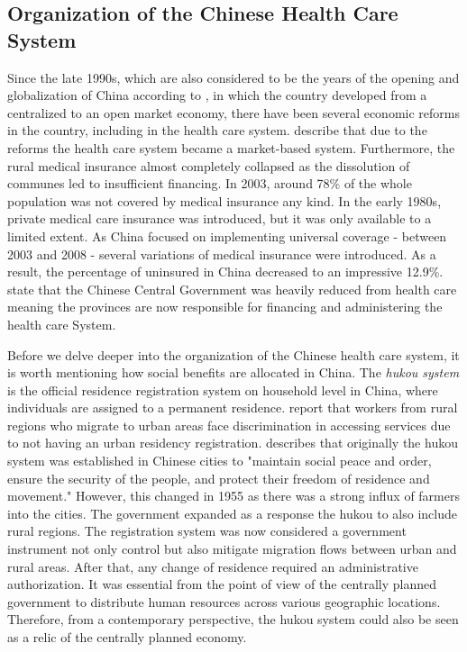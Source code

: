 \documentclass[
]{article}
\begin{document}
	\subsection{Organization of the Chinese Health Care System} \label{orga} 
	Since the late 1990s, which are also considered to be the years of the opening and globalization of China according to \cite{kanbur_fifty_2005} , in which the country developed from a centralized to an open market economy, there have been several economic reforms in the country, including in the health care system.
    \cite{shi_health_2018} describe that due to the reforms the health care system became a market-based system. Furthermore, the rural medical insurance almost completely collapsed as the dissolution of communes led to insufficient financing. In 2003, around 78\% of the whole population was not covered by medical insurance any kind. In the early 1980s, private medical care insurance was introduced, but it was only available to a limited extent. 
	As China focused on implementing universal coverage - between 2003 and 2008 - several variations of medical insurance were introduced. As a result, the percentage of uninsured in China decreased to an impressive 12.9\%. 
	 \cite{hougaard_chinese_2011} state that the Chinese Central Government was heavily reduced from health care meaning the provinces are now responsible for financing and administering the health care System. \par
	Before we delve deeper into the organization of the Chinese health care system, it is worth mentioning how social benefits are allocated in China.
	The \textit{hukou system} is the official residence registration system on household level in China, where individuals are assigned to a permanent residence.
	\cite{noauthor_oecd_nodate} report that workers from rural regions who migrate to urban areas face discrimination in accessing services due to not having an urban residency registration. 
	\cite{liu_institution_2005} describes  that originally the hukou system was established in Chinese cities to "maintain social peace and order, ensure the security of the people, and protect their freedom of residence and movement." 
	However, this changed in 1955 as there was a strong influx of farmers into the cities. The government expanded as a response the hukou to also include rural regions.  
    The registration system was now considered a government instrument not only control but also mitigate migration flows between urban and rural areas. After that, any change of residence required an administrative authorization. It was essential from the point of view of the centrally planned government to distribute human resources across various geographic locations. Therefore, from a contemporary perspective, the hukou system could also be seen as a relic of the centrally planned economy.
\end{document}
